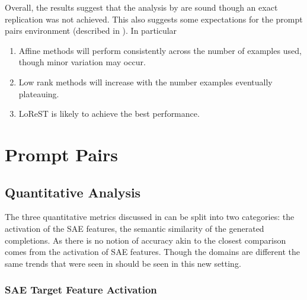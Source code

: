 Overall, the results suggest that the analysis by \citet{steering-clear} are sound though an exact replication was not achieved.
This also suggests some expectations for the prompt pairs environment (described in ).
In particular
\begin{enumerate}[nolistsep]
    \item Affine methods will perform consistently across the number of examples used, though minor variation may occur.
    \item Low rank methods will increase with the number examples eventually plateauing.
    \item LoReST is likely to achieve the best performance.
\end{enumerate}

\section{Prompt Pairs}
\label{sec:prompt-pairs-res}

\subsection{Quantitative Analysis}

The three quantitative metrics discussed in  can be split into two categories: the activation of the SAE features, the semantic similarity of the generated completions.
As there is no notion of accuracy akin to \citet{steering-clear} the closest comparison comes from the activation of SAE features.
Though the domains are different the same trends that were seen in  should be seen in this new setting.

\subsubsection{SAE Target Feature Activation}

